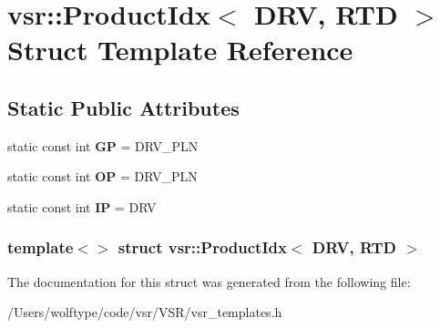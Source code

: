 \hypertarget{structvsr_1_1_product_idx_3_01_d_r_v_00_01_r_t_d_01_4}{\section{vsr\-:\-:Product\-Idx$<$ D\-R\-V, R\-T\-D $>$ Struct Template Reference}
\label{structvsr_1_1_product_idx_3_01_d_r_v_00_01_r_t_d_01_4}
}
\subsection*{Static Public Attributes}
\begin{DoxyCompactItemize}
\item 
\hypertarget{structvsr_1_1_product_idx_3_01_d_r_v_00_01_r_t_d_01_4_aa4499897645eb71357ecca1af44ad3c7}{static const int {\bfseries G\-P} = D\-R\-V\-\_\-\-P\-L\-N}\label{structvsr_1_1_product_idx_3_01_d_r_v_00_01_r_t_d_01_4_aa4499897645eb71357ecca1af44ad3c7}

\item 
\hypertarget{structvsr_1_1_product_idx_3_01_d_r_v_00_01_r_t_d_01_4_a49ed17636954e2c735f351d4f4375237}{static const int {\bfseries O\-P} = D\-R\-V\-\_\-\-P\-L\-N}\label{structvsr_1_1_product_idx_3_01_d_r_v_00_01_r_t_d_01_4_a49ed17636954e2c735f351d4f4375237}

\item 
\hypertarget{structvsr_1_1_product_idx_3_01_d_r_v_00_01_r_t_d_01_4_a61d0db20b13e23b53a8875726b1fea7e}{static const int {\bfseries I\-P} = D\-R\-V}\label{structvsr_1_1_product_idx_3_01_d_r_v_00_01_r_t_d_01_4_a61d0db20b13e23b53a8875726b1fea7e}

\end{DoxyCompactItemize}
\subsubsection*{template$<$$>$ struct vsr\-::\-Product\-Idx$<$ D\-R\-V, R\-T\-D $>$}



The documentation for this struct was generated from the following file\-:\begin{DoxyCompactItemize}
\item 
/\-Users/wolftype/code/vsr/\-V\-S\-R/vsr\-\_\-templates.\-h\end{DoxyCompactItemize}

